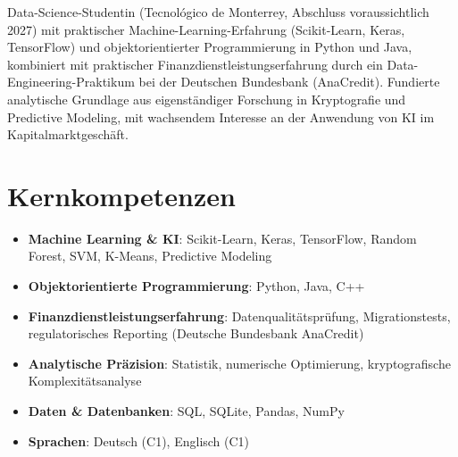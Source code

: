 \documentclass[11pt,a4paper,sans]{moderncv}
\begin{document}
\makecvtitle


\vspace{6pt}
\small{Data-Science-Studentin (Tecnológico de Monterrey, Abschluss voraussichtlich 2027) mit praktischer Machine-Learning-Erfahrung (Scikit-Learn, Keras, TensorFlow) und objektorientierter Programmierung in Python und Java, kombiniert mit praktischer Finanzdienstleistungserfahrung durch ein Data-Engineering-Praktikum bei der Deutschen Bundesbank (AnaCredit). Fundierte analytische Grundlage aus eigenständiger Forschung in Kryptografie und Predictive Modeling, mit wachsendem Interesse an der Anwendung von KI im Kapitalmarktgeschäft.}


\section{Kernkompetenzen}
\vspace{1pt}
\begin{itemize}

\item \textbf{Machine Learning \& KI}: Scikit-Learn, Keras, TensorFlow, Random Forest, SVM, K-Means, Predictive Modeling

\item \textbf{Objektorientierte Programmierung}: Python, Java, C++

\item \textbf{Finanzdienstleistungserfahrung}: Datenqualitätsprüfung, Migrationstests, regulatorisches Reporting (Deutsche Bundesbank AnaCredit)

\item \textbf{Analytische Präzision}: Statistik, numerische Optimierung, kryptografische Komplexitätsanalyse

\item \textbf{Daten \& Datenbanken}: SQL, SQLite, Pandas, NumPy

\item \textbf{Sprachen}: Deutsch (C1), Englisch (C1)

\end{itemize}

\end{document}
